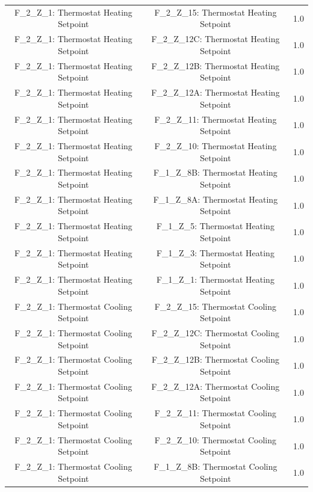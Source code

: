 \documentclass[aps, 10pt, a4paper]{article}
\begin{document}
\begin{longtable}{c|c||c}
                    F\_2\_Z\_1: Thermostat Heating Setpoint & F\_2\_Z\_15: Thermostat Heating Setpoint & 1.0 \\
                    F\_2\_Z\_1: Thermostat Heating Setpoint & F\_2\_Z\_12C: Thermostat Heating Setpoint & 1.0 \\
                    F\_2\_Z\_1: Thermostat Heating Setpoint & F\_2\_Z\_12B: Thermostat Heating Setpoint & 1.0 \\
                    F\_2\_Z\_1: Thermostat Heating Setpoint & F\_2\_Z\_12A: Thermostat Heating Setpoint & 1.0 \\
                    F\_2\_Z\_1: Thermostat Heating Setpoint & F\_2\_Z\_11: Thermostat Heating Setpoint & 1.0 \\
                    F\_2\_Z\_1: Thermostat Heating Setpoint & F\_2\_Z\_10: Thermostat Heating Setpoint & 1.0 \\
                    F\_2\_Z\_1: Thermostat Heating Setpoint & F\_1\_Z\_8B: Thermostat Heating Setpoint & 1.0 \\
                    F\_2\_Z\_1: Thermostat Heating Setpoint & F\_1\_Z\_8A: Thermostat Heating Setpoint & 1.0 \\
                    F\_2\_Z\_1: Thermostat Heating Setpoint & F\_1\_Z\_5: Thermostat Heating Setpoint & 1.0 \\
                    F\_2\_Z\_1: Thermostat Heating Setpoint & F\_1\_Z\_3: Thermostat Heating Setpoint & 1.0 \\
                    F\_2\_Z\_1: Thermostat Heating Setpoint & F\_1\_Z\_1: Thermostat Heating Setpoint & 1.0 \\
                    F\_2\_Z\_1: Thermostat Cooling Setpoint & F\_2\_Z\_15: Thermostat Cooling Setpoint & 1.0 \\
                    F\_2\_Z\_1: Thermostat Cooling Setpoint & F\_2\_Z\_12C: Thermostat Cooling Setpoint & 1.0 \\
                    F\_2\_Z\_1: Thermostat Cooling Setpoint & F\_2\_Z\_12B: Thermostat Cooling Setpoint & 1.0 \\
                    F\_2\_Z\_1: Thermostat Cooling Setpoint & F\_2\_Z\_12A: Thermostat Cooling Setpoint & 1.0 \\
                    F\_2\_Z\_1: Thermostat Cooling Setpoint & F\_2\_Z\_11: Thermostat Cooling Setpoint & 1.0 \\
                    F\_2\_Z\_1: Thermostat Cooling Setpoint & F\_2\_Z\_10: Thermostat Cooling Setpoint & 1.0 \\
                    F\_2\_Z\_1: Thermostat Cooling Setpoint & F\_1\_Z\_8B: Thermostat Cooling Setpoint & 1.0 \\

\end{longtable}
\end{document}
